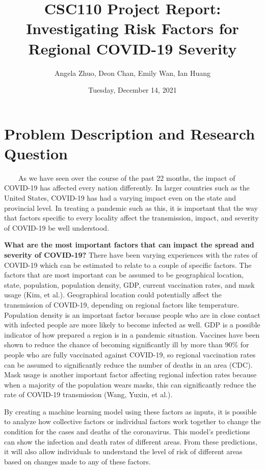 \documentclass[fontsize=11pt]{article}
\title{CSC110 Project Report: Investigating Risk Factors for Regional COVID-19 Severity}
\author{Angela Zhuo, Deon Chan, Emily Wan, Ian Huang}
\date{Tuesday, December 14, 2021}
\begin{document}
    \maketitle

    \section*{Problem Description and Research Question}
    ~~~~As we have seen over the course of the past 22 months, the impact of COVID-19 has affected every nation differently. In larger countries such as the United States, COVID-19 has had a varying impact even on the state and provincial level. In treating a pandemic such as this, it is important that the way that factors specific to every locality affect the transmission, impact, and severity of COVID-19 be well understood. \par

    \textbf{What are the most important factors that can impact the spread and severity of COVID-19?} There have been varying experiences with the rates of COVID-19 which can be estimated to relate to a couple of specific factors. The factors that are most important can be assumed to be geographical location, state, population, population density, GDP, current vaccination rates, and mask usage (Kim, et al.). Geographical location could potentially affect the transmission of COVID-19, depending on regional factors like temperature. Population density is an important factor because people who are in close contact with infected people are more likely to become infected as well. GDP is a possible indicator of how prepared a region is in a pandemic situation. Vaccines have been shown to reduce the chance of becoming significantly ill by more than 90\% for people who are fully vaccinated against COVID-19, so regional vaccination rates can be assumed to significantly reduce the number of deaths in an area (CDC). Mask usage is another important factor affecting regional infection rates because when a majority of the population wears masks, this can significantly reduce the rate of COVID-19 transmission (Wang, Yuxin, et al.). \par
    
    By creating a machine learning model using these factors as inputs, it is possible to analyze how collective factors or individual factors work together to change the condition for the cases and deaths of the coronavirus. This model’s predictions can show the infection and death rates of different areas. From these predictions, it will also allow individuals to understand the level of risk of different areas based on changes made to any of these factors. \par
\end{document}
